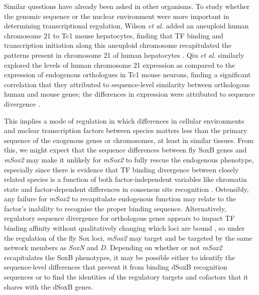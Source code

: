 \documentclass[withindex,glossary]{cam-thesis}
\begin{document}
Similar questions have already been asked in other organisms. To study
whether the genomic sequence or the nuclear environment were more
important in determining transcriptional regulation, Wilson \emph{et
al.} added an aneuploid human chromosome 21 to Tc1 mouse hepatocytes,
finding that TF binding and transcription initiation along this
aneuploid chromosome recapitulated the patterns present in chromosome 21
of human hepatocytes . Qiu \emph{et
al.} similarly explored the levels of human chromosome 21 expression as
compared to the expression of endogenous orthologues in Tc1 mouse
neurons, finding a significant correlation that they attributed to
sequence-level similarity between orthologous human and mouse genes; the
differences in expression were attributed to sequence divergence .

This implies a mode of regulation in which differences in cellular
environments and nuclear transcription factors between species matters
less than the primary sequence of the exogenous genes or chromosomes, at
least in similar tissues. From this, we might expect that the sequence
differences between fly SoxB genes and \emph{mSox2} may make it unlikely
for \emph{mSox2} to fully rescue the endogenous phenotype, especially
since there is evidence that TF binding divergence between closely
related species is a function of both factor-independent variables like
chromatin state and factor-dependent differences in consensus site
recognition . Ostensibly, any failure for
\emph{mSox2} to recapitulate endogenous function may relate to the
factor's inability to recognise the proper binding sequence.
Alternatively, regulatory sequence divergence for orthologous genes
appears to impact TF binding affinity without qualitatively changing
which loci are bound , so under
the regulation of the fly Sox loci, \emph{mSox2} may target and be
targeted by the same network members as \emph{SoxN} and \emph{D}.
Depending on whether or not \emph{mSox2} recapitulates the SoxB
phenotypes, it may be possible either to identify the sequence-level
differences that prevent it from binding dSoxB recognition sequences or
to find the identities of the regulatory targets and cofactors that it
shares with the dSoxB genes.
\end{document}

